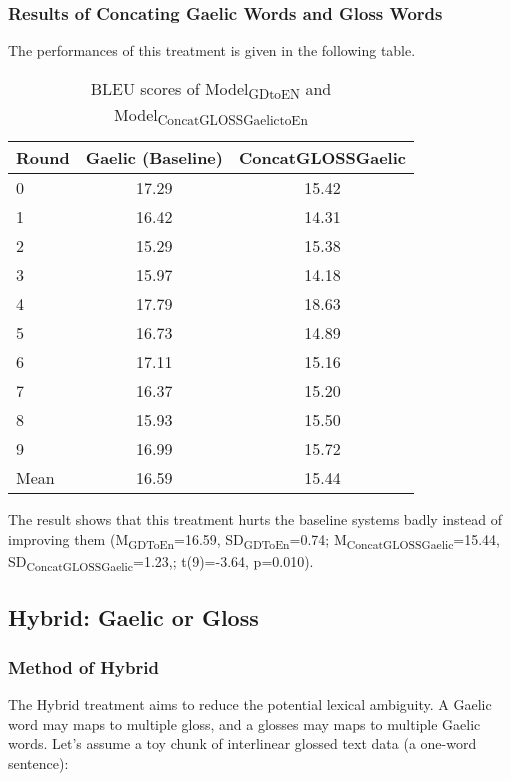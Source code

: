 \documentclass[final]{ua-thesis}
\numberwithin{equation}{section}
\begin{document}
\subsubsection{Results of Concating Gaelic Words and Gloss Words}
The performances of this treatment is given in the following table.
\begin{table}[ht]
\centering
\begin{tabular}{lcc}
  \hline
Round & Gaelic (Baseline) & ConcatGLOSSGaelic \\ 
  \hline
0 & 17.29 & 15.42 \\ 
  1 & 16.42 & 14.31 \\ 
  2 & 15.29 & 15.38 \\ 
  3 & 15.97 & 14.18 \\ 
  4 & 17.79 & 18.63 \\ 
  5 & 16.73 & 14.89 \\ 
  6 & 17.11 & 15.16 \\ 
  7 & 16.37 & 15.20 \\ 
  8 & 15.93 & 15.50 \\ 
  9 & 16.99 & 15.72 \\ 
   \hline
Mean & 16.59 & 15.44 \\ 
   \hline
\end{tabular}
\caption{BLEU scores of Model\textsubscript{GDtoEN} and Model\textsubscript{ConcatGLOSSGaelictoEn} } 
\label{Table:Concating}
\end{table}\newline
The result shows that this treatment hurts the baseline systems badly instead of improving them (M\textsubscript{GDToEn}=16.59, SD\textsubscript{GDToEn}=0.74; M\textsubscript{ConcatGLOSSGaelic}=15.44, SD\textsubscript{ConcatGLOSSGaelic}=1.23,; t(9)=-3.64, p=0.010).

\subsection{Hybrid: Gaelic or Gloss}
\subsubsection{Method of Hybrid}
The Hybrid treatment aims to reduce the potential lexical ambiguity. A Gaelic word may maps to multiple gloss, and a glosses may maps to multiple Gaelic words. Let's assume a toy chunk of interlinear glossed text data (a one-word sentence): 
\end{document}
